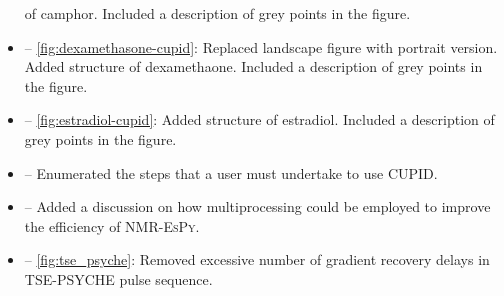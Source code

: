 \documentclass[12pt]{article}
\begin{document}
\begin{itemize}
            of camphor. Included a description of grey points in
            the figure.
        \item {} -- \cref{fig:dexamethasone-cupid}:
            Replaced landscape figure with portrait version. Added structure of
            dexamethaone. Included a description of grey points in
            the figure.
        \item {} -- \cref{fig:estradiol-cupid}: Added
            structure of estradiol. Included a description of grey points in
            the figure.
        \item {} -- Enumerated the steps that a user
            must undertake to use CUPID.
        \item {} -- Added a discussion on how
            multiprocessing could be employed to improve the efficiency of
            \textsc{NMR-EsPy}.
        \item {} -- \cref{fig:tse_psyche}: Removed
            excessive number of gradient recovery delays in TSE-PSYCHE pulse
            sequence.
    \end{itemize}
\end{document}
